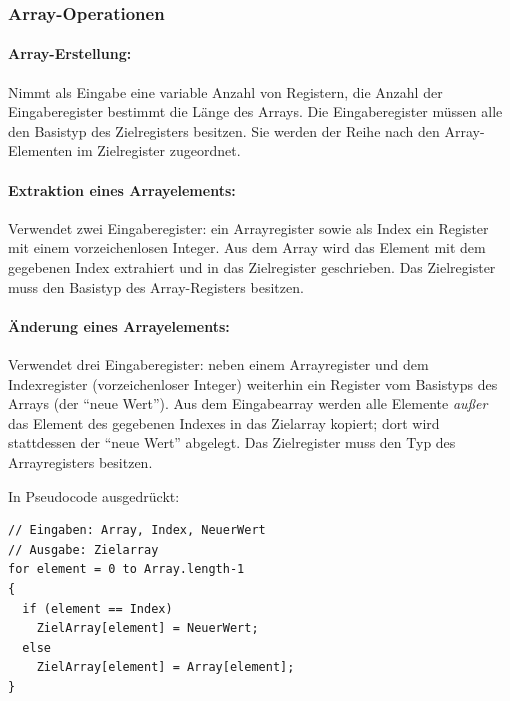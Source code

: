 \documentclass[twoside,a4paper,fleqn,12pt]{book}
\begin{document}

\subsubsection{Array-Operationen}

\paragraph{Array-Erstellung:} Nimmt als Eingabe eine variable Anzahl von Registern, die Anzahl der Eingaberegister bestimmt die Länge des Arrays.
Die Eingaberegister müssen alle den Basistyp des Zielregisters besitzen. Sie werden der Reihe nach den Array-Elementen im Zielregister zugeordnet.



\paragraph{Extraktion eines Arrayelements:} Verwendet zwei Eingaberegister: ein Arrayregister sowie als Index ein Register mit einem vorzeichenlosen Integer.
Aus dem Array wird das Element mit dem gegebenen Index extrahiert und in das Zielregister geschrieben.
Das Zielregister muss den Basistyp des Array-Registers besitzen.



\paragraph{Änderung eines Arrayelements:} Verwendet drei Eingaberegister: neben einem Arrayregister und dem Indexregister (vorzeichenloser Integer)
weiterhin ein Register vom Basistyps des Arrays (der "`neue Wert"').
Aus dem Eingabearray werden alle Elemente \emph{außer} das Element des gegebenen Indexes in das Zielarray kopiert;
dort wird stattdessen der "`neue Wert"' abgelegt. Das Zielregister muss den Typ des Arrayregisters besitzen.

In Pseudocode ausgedrückt:
\begin{lstlisting}
// Eingaben: Array, Index, NeuerWert
// Ausgabe: Zielarray
for element = 0 to Array.length-1
{
  if (element == Index)
    ZielArray[element] = NeuerWert;
  else
    ZielArray[element] = Array[element];
}
\end{lstlisting}
\end{document}
